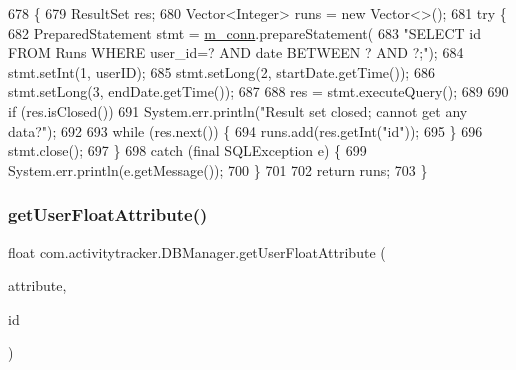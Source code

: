 \begin{DoxyCode}
678                                                                                                            
              \{
679         ResultSet res;
680         Vector<Integer> runs = \textcolor{keyword}{new} Vector<>();
681         \textcolor{keywordflow}{try} \{
682             PreparedStatement stmt = \mbox{\hyperlink{classcom_1_1activitytracker_1_1_d_b_manager_a064088d13ac09eb147fdc19268771521}{m\_conn}}.prepareStatement(
683                     \textcolor{stringliteral}{"SELECT id FROM Runs WHERE user\_id=? AND date BETWEEN ? AND ?;"});
684             stmt.setInt(1, userID);
685             stmt.setLong(2, startDate.getTime());
686             stmt.setLong(3, endDate.getTime());
687 
688             res = stmt.executeQuery();
689 
690             \textcolor{keywordflow}{if} (res.isClosed())
691                 System.err.println(\textcolor{stringliteral}{"Result set closed; cannot get any data?"});
692 
693             \textcolor{keywordflow}{while} (res.next()) \{
694                 runs.add(res.getInt(\textcolor{stringliteral}{"id"}));
695             \}
696             stmt.close();
697         \}
698         \textcolor{keywordflow}{catch} (\textcolor{keyword}{final} SQLException e) \{
699             System.err.println(e.getMessage());
700         \}
701 
702         \textcolor{keywordflow}{return} runs;
703     \}
\end{DoxyCode}
\mbox{\label{classcom_1_1activitytracker_1_1_d_b_manager_a98df66254bec4d74b29cfe468a9fc794}} 
\subsubsection{\texorpdfstring{get\+User\+Float\+Attribute()}{getUserFloatAttribute()}}
{\footnotesize\ttfamily float com.\+activitytracker.\+D\+B\+Manager.\+get\+User\+Float\+Attribute (\begin{DoxyParamCaption}\item[{final \mbox{\hyperlink{enumcom_1_1activitytracker_1_1_user_attribute}{User\+Attribute}}}]{attribute,  }\item[{final int}]{id }\end{DoxyParamCaption})}

